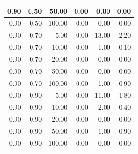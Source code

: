 \documentclass{bmstu}
\begin{document}
\begin{longtable}{|r|r|r|r|r|r|}
0.90 & 0.50 & 50.00 & 0.00 & 0.00 & 0.00 \\ \hline
0.90 & 0.50 & 100.00 & 0.00 & 0.00 & 0.00 \\ \hline
0.90 & 0.70 & 5.00 & 0.00 & 13.00 & 2.20 \\ \hline
0.90 & 0.70 & 10.00 & 0.00 & 1.00 & 0.10 \\ \hline
0.90 & 0.70 & 20.00 & 0.00 & 0.00 & 0.00 \\ \hline
0.90 & 0.70 & 50.00 & 0.00 & 0.00 & 0.00 \\ \hline
0.90 & 0.70 & 100.00 & 0.00 & 1.00 & 0.90 \\ \hline
0.90 & 0.90 & 5.00 & 0.00 & 11.00 & 1.80 \\ \hline
0.90 & 0.90 & 10.00 & 0.00 & 2.00 & 0.40 \\ \hline
0.90 & 0.90 & 20.00 & 0.00 & 0.00 & 0.00 \\ \hline
0.90 & 0.90 & 50.00 & 0.00 & 1.00 & 0.90 \\ \hline
0.90 & 0.90 & 100.00 & 0.00 & 0.00 & 0.00 \\ \hline
\end{longtable}
\end{document}
